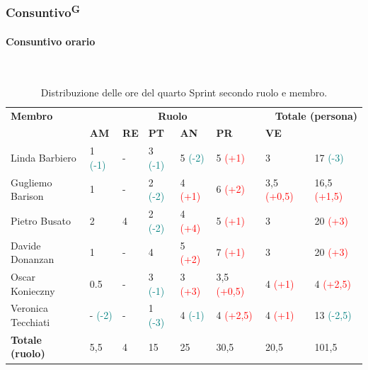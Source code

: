 \documentclass[8pt]{article}
\newcommand{\glossterm}[1]{#1\textsuperscript{G}} %
\newcommand{\subsubsubsection}[1]{\paragraph{#1}\mbox{}\\}
\begin{document}
\subsubsection{\glossterm{Consuntivo}}
\subsubsubsection{Consuntivo orario}
\begin{table}[ht!]
	\centering
	\begin{tabular}{p{3cm} p{1.4cm} p{1.6cm} p{1.7cm} p{1.4cm} p{1.4cm} p{1.5cm} p{2cm}}
		\toprule
        \textbf{Membro} & \multicolumn{5}{c}{\textbf{Ruolo}} & \multicolumn{2}{r}{\textbf{Totale (persona)}}\\
		& \textbf{AM} & \textbf{RE} & \textbf{PT} & \textbf{AN} & \textbf{PR} & \textbf{VE}\\
		\midrule
        Linda Barbiero     & 1 \textcolor{teal}{(-1)} & - & 3 \textcolor{teal}{(-1)} & 5 \textcolor{teal}{(-2)} & 5 \textcolor{red}{(+1)} & 3 & 17 \textcolor{teal}{(-3)} \\
        Gugliemo Barison   & 1 & - & 2 \textcolor{teal}{(-2)} & 4 \textcolor{red}{(+1)} & 6
        \textcolor{red}{(+2)} & 3,5 \textcolor{red}{(+0,5)} & 16,5 \textcolor{red}{(+1,5)} \\
        Pietro Busato      & 2 & 4 & 2 \textcolor{teal}{(-2)} & 4
        \textcolor{red}{(+4)} & 5 \textcolor{red}{(+1)} & 3 & 20 \textcolor{red}{(+3)} \\
        Davide Donanzan    & 1 & - & 4 & 5 \textcolor{red}{(+2)} & 7 \textcolor{red}{(+1)} & 3 & 20 \textcolor{red}{(+3)} \\
        Oscar Konieczny    & 0.5  & - & 3 \textcolor{teal}{(-1)} & 3
        \textcolor{red}{(+3)} & 3,5 \textcolor{red}{(+0,5)} & 4 \textcolor{red}{(+1)} & 4 \textcolor{red}{(+2,5)}\\
        Veronica Tecchiati & - \textcolor{teal}{(-2)} & - & 1 \textcolor{teal}{(-3)} & 4 \textcolor{teal}{(-1)} & 4 \textcolor{red}{(+2,5)} & 4 \textcolor{red}{(+1)} & 13 \textcolor{teal}{(-2,5)} \\
        \midrule
        \textbf{Totale (ruolo)} & 5,5 & 4 & 15 & 25 & 30,5 & 20,5 & 101,5 \\
		\bottomrule
	\end{tabular}
	\caption{Distribuzione delle ore del quarto Sprint secondo ruolo e membro.}
	\label{table:Distribuzione delle ore del quarto Sprint secondo ruolo e membr}
\end{table}
\end{document}

